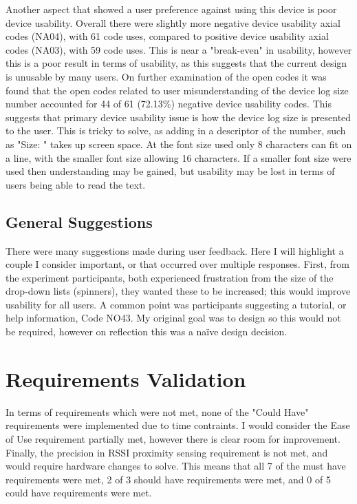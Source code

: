\documentclass{l4proj}
\begin{document}
Another aspect that showed a user preference against using this device is poor device usability. Overall there were slightly more negative device usability axial codes (NA04), with 61 code uses, compared to positive device usability axial codes (NA03), with 59 code uses. This is near a "break-even" in usability, however this is a poor result in terms of usability, as this suggests that the current design is unusable by many users. On further examination of the open codes it was found that the open codes related to user misunderstanding of the device log size number accounted for 44 of 61 (72.13\%) negative device usability codes. This suggests that primary device usability issue is how the device log size is presented to the user. This is tricky to solve, as adding in a descriptor of the number, such as "Size: " takes up screen space. At the font size used only 8 characters can fit on a line, with the smaller font size allowing 16 characters. If a smaller font size were used then understanding may be gained, but usability may be lost in terms of users being able to read the text.

\subsection{General Suggestions}

There were many suggestions made during user feedback. Here I will highlight a couple I consider important, or that occurred over multiple responses. First, from the experiment participants, both experienced frustration from the size of the drop-down lists (spinners), they wanted these to be increased; this would improve usability for all users. A common point was participants suggesting a tutorial, or help information, Code NO43. My original goal was to design so this would not be required, however on reflection this was a naïve design decision.

\section{Requirements Validation}

In terms of requirements which were not met, none of the "Could Have" requirements were implemented due to time contraints. I would consider the Ease of Use requirement partially met, however there is clear room for improvement. Finally, the precision in RSSI proximity sensing requirement is not met, and would require hardware changes to solve. This means that all 7 of the must have requirements were met, 2 of 3 should have requirements were met, and 0 of 5 could have requirements were met.
\end{document}
